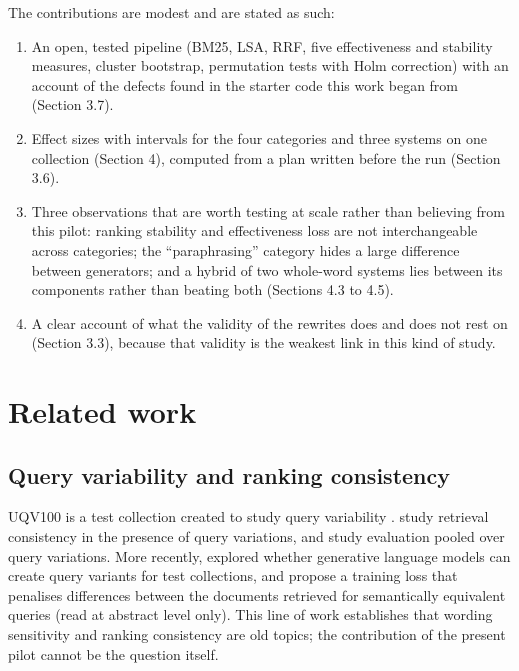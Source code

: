 \documentclass[
  11pt,
]{article}
\providecommand{\tightlist}{%
  \setlength{\itemsep}{0pt}\setlength{\parskip}{0pt}}
\begin{document}
The contributions are modest and are stated as such:

\begin{enumerate}
\def\labelenumi{\arabic{enumi}.}
\tightlist
\item
  An open, tested pipeline (BM25, LSA, RRF, five effectiveness and
  stability measures, cluster bootstrap, permutation tests with Holm
  correction) with an account of the defects found in the starter code
  this work began from (Section 3.7).
\item
  Effect sizes with intervals for the four categories and three systems
  on one collection (Section 4), computed from a plan written before the
  run (Section 3.6).
\item
  Three observations that are worth testing at scale rather than
  believing from this pilot: ranking stability and effectiveness loss
  are not interchangeable across categories; the ``paraphrasing''
  category hides a large difference between generators; and a hybrid of
  two whole-word systems lies between its components rather than beating
  both (Sections 4.3 to 4.5).
\item
  A clear account of what the validity of the rewrites does and does not
  rest on (Section 3.3), because that validity is the weakest link in
  this kind of study.
\end{enumerate}

\hypertarget{related-work}{%
\section{Related work}\label{related-work}}

\hypertarget{query-variability-and-ranking-consistency}{%
\subsection{Query variability and ranking
consistency}\label{query-variability-and-ranking-consistency}}

UQV100 is a test collection created to study query variability
\citep{bailey2016}. \citet{bailey2017} study retrieval consistency in
the presence of query variations, and \citet{moffat2015} study
evaluation pooled over query variations. More recently,
\citet{alaofi2023} explored whether generative language models can
create query variants for test collections, and \citet{campese2025}
propose a training loss that penalises differences between the documents
retrieved for semantically equivalent queries (read at abstract level
only). This line of work establishes that wording sensitivity and
ranking consistency are old topics; the contribution of the present
pilot cannot be the question itself.
\end{document}
